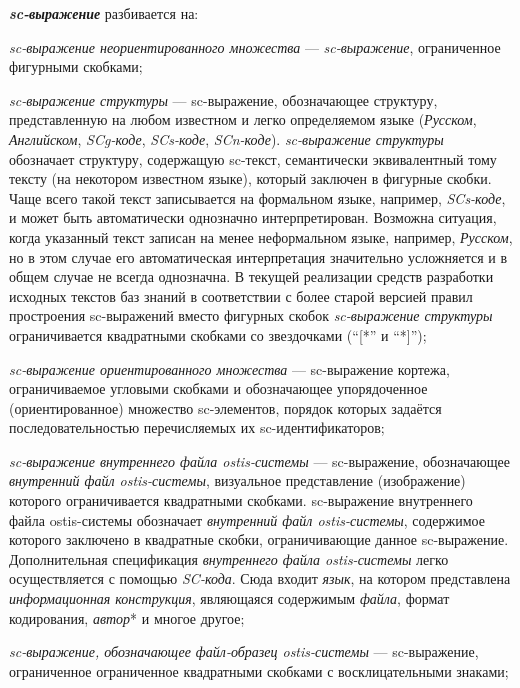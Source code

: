 \textbf{\textit{sc-выражение}} разбивается на:
\begin{textitemize}
	\item \textit{sc-выражение неориентированного множества} --- \textit{sc-выражение}, ограниченное фигурными скобками;
	\item \textit{sc-выражение структуры} --- sc-выражение, обозначающее структуру, представленную на любом известном и легко определяемом языке (\textit{Русском}, \textit{Английском}, \textit{SCg-коде}, \textit{SCs-коде}, \textit{SCn-коде}).
	\textit{sc-выражение структуры} обозначает структуру, содержащую sc-текст, семантически эквивалентный тому тексту (на некотором известном языке), который заключен в фигурные скобки. Чаще всего такой текст записывается на формальном языке, например, \textit{SCs-коде}, и может быть автоматически однозначно интерпретирован. Возможна ситуация, когда указанный текст записан на менее неформальном языке, например, \textit{Русском}, но в этом случае его автоматическая интерпретация значительно усложняется и в общем случае не всегда однозначна.
	В текущей реализации средств разработки исходных текстов баз знаний в соответствии с более старой версией правил простроения sc-выражений вместо фигурных скобок \textit{sc-выражение структуры} ограничивается квадратными скобками со звездочками (``[*'' и ``*]'');
	\item \textit{sc-выражение ориентированного множества} --- sc-выражение кортежа, ограничиваемое угловыми скобками и обозначающее упорядоченное (ориентированное) множество sc-элементов, порядок которых задаётся последовательностью перечисляемых их sc-идентификаторов;
	\item \textit{sc-выражение внутреннего файла ostis-системы} --- sc-выражение, обозначающее \textit{внутренний файл ostis-системы}, визуальное представление (изображение) которого ограничивается квадратными скобками. sc-выражение внутреннего файла ostis-системы обозначает \textit{внутренний файл ostis-системы}, содержимое которого заключено в квадратные скобки, ограничивающие данное sc-выражение. Дополнительная спецификация \textit{внутреннего файла ostis-системы} легко осуществляется с помощью \textit{SC-кода}. Сюда входит \textit{язык}, на котором представлена \textit{информационная конструкция}, являющаяся содержимым \textit{файла}, формат кодирования, \textit{автор}* и многое другое;
	\item \textit{sc-выражение, обозначающее файл-образец ostis-системы} --- sc-выражение, ограниченное ограниченное квадратными скобками с восклицательными знаками;

\end{textitemize}
